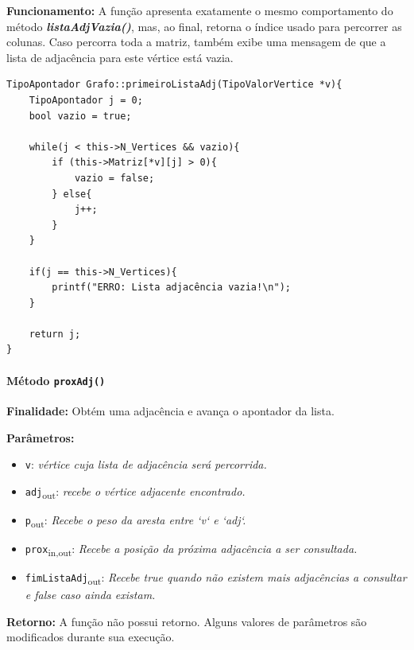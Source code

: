 \documentclass{article}
\begin{document}
    \textbf{Funcionamento:} A função apresenta exatamente o mesmo comportamento do método \textbf{\textit{listaAdjVazia()}}, mas, ao final, retorna o índice usado para percorrer as colunas. Caso percorra toda a matriz, também exibe uma mensagem de que a lista de adjacência para este vértice está vazia.

\begin{verbatim}
TipoApontador Grafo::primeiroListaAdj(TipoValorVertice *v){
    TipoApontador j = 0;
    bool vazio = true;

    while(j < this->N_Vertices && vazio){
        if (this->Matriz[*v][j] > 0){
            vazio = false;
        } else{
            j++;
        }
    }

    if(j == this->N_Vertices){
        printf("ERRO: Lista adjacência vazia!\n");
    }

    return j;
}
\end{verbatim}
\paragraph{Método \texttt{proxAdj()}}

    \mbox{}\par
    \noindent
    \textbf{Finalidade:} Obtém uma adjacência e avança o apontador da lista.

    \textbf{Parâmetros:}
    \begin{itemize}
       \item \texttt{v}: \textit{vértice cuja lista de adjacência será percorrida.}

        \item \texttt{adj}\textsubscript{out}: \textit{recebe o vértice adjacente encontrado.}

        \item \texttt{p}\textsubscript{out}: \textit{Recebe o peso da aresta entre `v` e `adj`.}

        \item \texttt{prox}\textsubscript{in,out}: \textit{Recebe a posição da próxima adjacência a ser consultada.}

        \item \texttt{fimListaAdj}\textsubscript{out}: \textit{Recebe true quando não existem mais adjacências a consultar e false caso ainda existam.}
        
    \end{itemize}

    \textbf{Retorno:} A função não possui retorno. Alguns valores de parâmetros são modificados durante sua execução.
\end{document}
